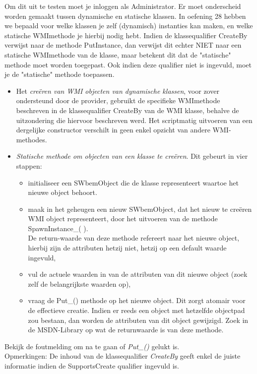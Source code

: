 \documentclass[11pt,a4paper]{report}
\begin{document}
Om dit uit te testen moet je inloggen als Administrator.
Er moet onderscheid worden gemaakt tussen dynamische en statische klassen. In oefening 28 hebben we bepaald voor welke klassen je zelf (dynamisch) instanties kan maken, en welke statische WMImethode je hierbij nodig hebt. Indien de klassequalifier CreateBy verwijst naar de methode PutInstance, dan verwijst dit echter NIET naar een statische WMImethode van de klasse, maar betekent dit dat de "statische" methode moet worden toegepast. Ook indien deze qualifier niet is ingevuld, moet je de "statische" methode toepassen.
\begin{itemize}
	\item Het \textit{creëren van WMI objecten van dynamische klassen}, voor zover ondersteund door de provider, gebruikt de specifieke WMImethode beschreven in de klassequalifier CreateBy van de WMI klasse, behalve de uitzondering die hiervoor beschreven werd. Het scriptmatig uitvoeren van een dergelijke constructor verschilt in geen enkel opzicht van andere WMI-methodes.
	\item \textit{Statische methode om objecten van een klasse te creëren}. Dit gebeurt in vier stappen:
	\begin{itemize}
		\item initialiseer een SWbemObject die de klasse representeert waartoe het nieuwe object behoort.
		\item maak in het geheugen een nieuw SWbemObject, dat het nieuw te creëren WMI object representeert, door het uitvoeren van de methode SpawnInstance\_( ).
		\\De return-waarde van deze methode refereert naar het nieuwe object, hierbij zijn de attributen hetzij niet, hetzij op een default waarde ingevuld,
		\item vul de actuele waarden in van de attributen van dit nieuwe object (zoek zelf de belangrijkste waarden op),
		\item vraag de Put\_() methode op het nieuwe object. Dit zorgt atomair voor de effectieve creatie. Indien er reeds een object met hetzelfde objectpad zou bestaan, dan worden de attributen van dit object gewijzigd. Zoek in de MSDN-Library op wat de returnwaarde is van deze methode.
	\end{itemize}
\end{itemize}
Bekijk de foutmelding om na te gaan of \textit{Put\_()} gelukt is.
\\Opmerkingen: De inhoud van de klassequalifier \textit{CreateBy} geeft enkel de juiste informatie indien de SupportsCreate qualifier ingevuld is.
\end{document}
